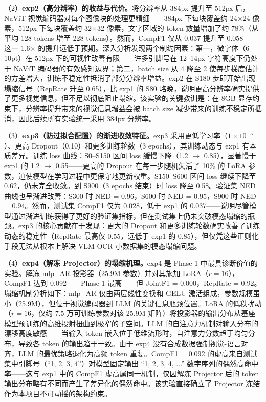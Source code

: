 （2）\textbf{exp2（高分辨率）的收益与代价。}将分辨率从 384px 提升至 512px 后，NaViT 视觉编码器对每个图像块的处理更精细——384px 下每块覆盖约 24$\times$24 像素，512px 下每块覆盖约 32$\times$32 像素，文字区域的 token 数量增加了约 78\%（从平均 128 tokens 增至 228 tokens）。然而，CompF1 仅从 0.037 提升至 0.058——这一 1.6$\times$ 的提升远低于预期。深入分析发现两个制约因素：第一，微字体（6--10pt）在 512px 下的可视性改善有限——许多引脚号在 12--14px 字符高度下仍处于 NaViT 编码器的有效感知边界；第二，batch size 从 4 降至 2 使每步梯度估计的方差增大，训练不稳定性抵消了部分分辨率增益。exp2 在 S180 步即开始出现塌缩信号（RepRate 升至 0.65），比 exp1 的 S80 略晚，说明更高分辨率确实提供了更多视觉信息，但不足以彻底阻止塌缩。该实验的关键教训是：在 8GB 显存约束下，分辨率提升带来的视觉信息增益会被 batch size 减少带来的训练不稳定所抵消，因此后续所有实验统一采用 384px 分辨率。

（3）\textbf{exp3（防过拟合配置）的渐进收敛特征。}exp3 采用更低学习率（$1\times10^{-5}$）、更高 Dropout（0.10）和更多训练轮数（3 epochs），其训练动态与 exp1 有本质差异。训练 loss 曲线：S0--S150 区间 loss 缓慢下降（1.2 $\to$ 0.85），显著慢于 exp1 的 1.2 $\to$ 0.55——更高的 Dropout 在每一步随机失活了 10\% 的 LoRA 参数，迫使模型在学习过程中更保守地更新权重。S150--S600 区间 loss 继续下降至 0.62，仍未完全收敛。到 S900（3 epochs 结束）时 loss 降至 0.58。验证集 NED 曲线也呈渐进改善：S300 时 NED = 0.96，S600 时 NED = 0.95，S900 时 NED = 0.94。然而，测试集 CompF1 仅为 0.028，低于 exp1 的 0.037——说明尽管模型通过渐进训练获得了更好的验证集指标，但在测试集上仍未突破模态塌缩的瓶颈。exp3 的核心贡献在于发现：更大的 Dropout 和更多训练轮数确实改善了训练动态的稳定性（RepRate 最高仅 0.55，远低于 exp1 的 0.85），但仅凭这些正则化手段无法从根本上解决 VLM-OCR 小数据集的模态塌缩问题。

（4）\textbf{exp4（解冻 Projector）的塌缩机理。}exp4 是 Phase 1 中最具诊断价值的实验。解冻 mlp\_AR 投影器（25.9M 参数）并对其施加 LoRA（$r=16$），CompF1 达到 0.092——Phase 1 最高——但 JointF1 = 0.000，RepRate = 0.92。塌缩机制分析如下：mlp\_AR 仅由两层线性变换和 GELU 激活组成，参数规模虽小（25.9M），但位于视觉编码器到 LLM 的关键信息瓶颈位置。LoRA 的低秩扰动（$r=16$，仅约 7.5 万可训练参数对该 25.9M 矩阵）将投影器的输出分布从基座模型预训练的高维投射扭曲到极窄的子空间。LLM 的自注意力机制对输入分布的漂移高度敏感——当输入 token 嵌入位于低维流形时，自注意力分数趋于均匀分布，导致各 token 的输出趋于一致。由于 exp4 没有合成数据强制视觉-语言对齐，LLM 的最优策略退化为高频 token 重复。CompF1 = 0.092 的虚高来自测试集中引脚号（``1, 2, 3, 4''）对模型固定输出 ``1, 2, 3, 4, ...'' 数字序列的偶然高命中率——这与 exp1 中的 CompF1 虚高属同一机制，仅因解冻 Projector 后的 token 输出分布略有不同而产生了差异化的偶然命中。该实验直接确立了 Projector 冻结作为本项目不可动摇的架构约束。


